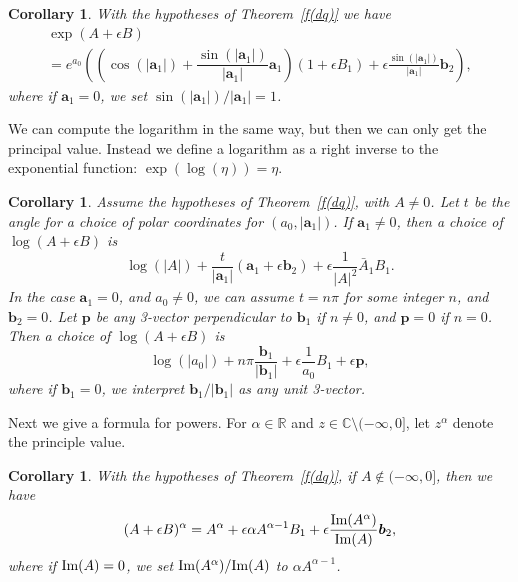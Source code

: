 \documentclass[12pt,reqno]{amsart}
\newtheorem{cor}[theorem]{Corollary}
\begin{document}
\begin{cor}
\label{exp dq}
With the hypotheses of Theorem~\ref{f(dq)} we have
\begin{multline}
\label{exp theta}
\exp(A + \epsilon B ) \\
= e^{a_0} \left(\left(\cos(|\bm a_1|) + \dfrac{\sin(|\bm a_1|)}{|\bm a_1|} \bm a_1 \right) \left(1 + \epsilon B_1\right) + \epsilon\frac{\sin(|\bm a_1|)}{|\bm a_1|} \bm b_2\right),
\end{multline}
where if $\bm a_1 = 0$, we set $\sin(|\bm a_1|)/|\bm a_1| = 1$.
\end{cor}

We can compute the logarithm in the same way, but then we can only get the principal value.  Instead we define a logarithm as a right inverse to the exponential function: $\exp(\log(\eta)) = \eta$.

\begin{cor}
\label{log dq}
Assume the hypotheses of Theorem~\ref{f(dq)}, with $A \ne 0$.  Let $t$ be the angle for a choice of polar coordinates for $(a_0, |\bm a_1|)$.  If $\bm a_1 \ne 0$, then a choice of $\log(A+\epsilon B)$ is
\begin{equation}
\log(|A|) + \dfrac t{|\bm a_1|} (\bm a_1 + \epsilon \bm b_2) + \epsilon \dfrac1{|A|^2} \bar A_1 B_1 .
\end{equation}
In the case $\bm a_1 = 0$, and $a_0 \ne 0$, we can assume $t = n \pi$ for some integer $n$, and $\bm b_2 = 0$.  Let $\bm p$ be any 3-vector perpendicular to $\bm b_1$ if $n \ne 0$, and $\bm p = 0$ if $n = 0$.  Then a choice of $\log(A + \epsilon B)$ is
\begin{equation}
\label{t=n pi}
\log(|a_0|) + n \pi \dfrac{\bm b_1}{|\bm b_1|} + \epsilon \dfrac 1{a_0} B_1 + \epsilon \bm p,
\end{equation}
where if $\bm b_1 = 0$, we interpret $\bm b_1 / |\bm b_1|$ as any unit 3-vector.
\end{cor}

Next we give a formula for powers.  For $\alpha \in \mathbb R$ and $z \in \mathbb C \setminus (-\infty,0]$, let $z^\alpha$ denote the principle value.

\begin{cor}
With the hypotheses of Theorem~\ref{f(dq)}, if $A \notin (-\infty,0]$, then we have
\begin{equation}
(A + \epsilon B )^\alpha =
A^\alpha + \epsilon \alpha A^{\alpha - 1} B_1 + \epsilon \frac{\text{\rm Im}(A^\alpha)}{\text{\rm Im}(A)} \bm b_2 ,
\end{equation}
where if $\text{\rm Im}(A) = 0$, we set ${\text{\rm Im}(A^\alpha)}/{\text{\rm Im}(A)}$ to $\alpha A^{\alpha - 1} $.
\end{cor}
\end{document}
